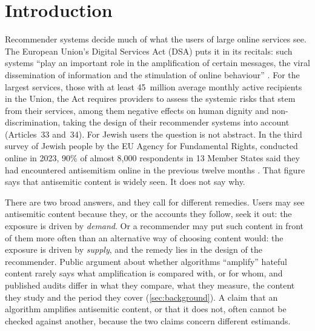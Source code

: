 \section{Introduction}\label{sec:intro}

Recommender systems decide much of what the users of large online services
see. The European Union's Digital Services Act (DSA) puts it in its recitals:
such systems ``play an important role in the amplification of certain
messages, the viral dissemination of information and the stimulation of
online behaviour'' \citep[Recital~70]{eu2022dsa}. For the largest services,
those with at least 45~million average monthly active recipients in the
Union, the Act requires providers to assess the systemic risks that stem from
their services, among them negative effects on human dignity and
non-discrimination, taking the design of their recommender systems into
account (Articles~33 and~34). For Jewish users the question is not abstract.
In the third survey of Jewish people by the EU Agency for Fundamental Rights,
conducted online in 2023, 90\% of almost 8{,}000 respondents in 13 Member
States said they had encountered antisemitism online in the previous twelve
months \citep{fra2024antisemitism}. That figure says that antisemitic content
is widely seen. It does not say why.

There are two broad answers, and they call for different remedies. Users may
see antisemitic content because they, or the accounts they follow, seek it
out: the exposure is driven by \emph{demand}. Or a recommender may put such
content in front of them more often than an alternative way of choosing
content would: the exposure is driven by \emph{supply}, and the remedy lies in
the design of the recommender. Public argument about whether algorithms
``amplify'' hateful content rarely says what amplification is compared with,
or for whom, and published audits differ in what they compare, what they
measure, the content they study and the period they cover
(\cref{sec:background}). A claim that an algorithm amplifies antisemitic
content, or that it does not, often cannot be checked against another,
because the two claims concern different estimands.

